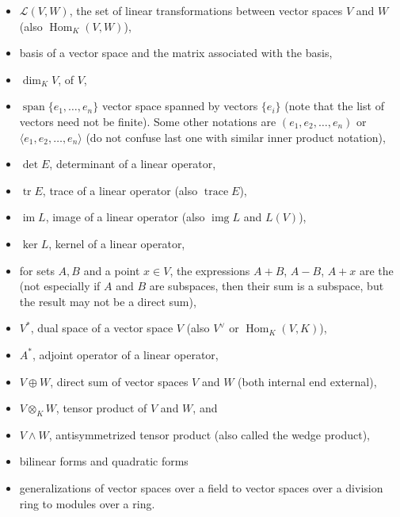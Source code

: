 \documentclass[12pt]{article}
\begin{document}
\begin{itemize}
\item $\mathscr{L}(V,W)$, the set of linear transformations between vector spaces $V$ and $W$ (also $\operatorname{Hom}_K(V,W)$),
\item basis of a vector space and the matrix associated with the basis,
\item $\dim_K V$,  of $V$,
\item $\operatorname{span}\{e_1,\ldots,e_n\}$ vector space spanned by vectors $\{e_i\}$ (note that the list of vectors need not be finite). Some other notations are $(e_1,e_2,\ldots,e_n)$ or $\langle e_1,e_2,\ldots,e_n\rangle$ (do not confuse last one with similar inner product notation),
\item $\det E$, determinant of a linear operator,
\item $\operatorname{tr} E$, trace of a linear operator (also $\operatorname{trace} E$),
\item $\operatorname{im} L$, image of a linear operator (also $\operatorname{img} L$ and $L(V)$),
\item $\operatorname{ker} L$, kernel of a linear operator,
\item for sets $A,B$ and  a point $x\in V$, the expressions $A+B$, $A-B$, $A+x$ 
are the  (not especially if $A$ and $B$ are subspaces, then their sum is a subspace, but the result may not be a direct sum),
\item $V^\ast$, dual space of a vector space $V$ (also $V^\vee$ or $\operatorname{Hom}_K(V,K)$), 
\item $A^\ast$, adjoint operator of a linear operator,
\item $V\oplus W$, direct sum of vector spaces $V$ and $W$ (both internal end external),
\item $V\otimes_K W$, tensor product of $V$ and $W$, and
\item $V\wedge W$, antisymmetrized tensor product (also called the wedge product),
\item bilinear forms and quadratic forms
\item generalizations of vector spaces over a field to vector spaces over a division ring to modules over a ring.
\end{itemize}
\end{document}
